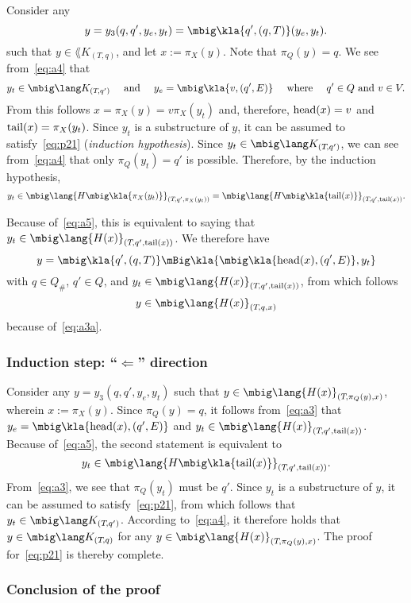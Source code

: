 Consider any
\[
 y = y_3(q,q',y_e,y_t) = \mbig\kla{q',(q,T)}(y_e,y_t).
\]
such that $y\in\lang K_{(T,q)}$, and let $x:=\pi_X(y)$. Note that $\pi_Q(y) =
q$.  We see from~\eqref{eq:a4} that
\[
 y_t \in \mbig\lang K_{(T\!,q')}
 \quad\text{ and }\quad
 y_e = \mbig\kla{v,(q',E)}
 \quad\text{ where }\quad
 q'\in Q \text{ and } v\in V.
\]
From this follows $x = \pi_X(y) = v\pi_X(y_t)$ and, therefore, $\operatorname{head}(x) = v$
and $\operatorname{tail}(x)=\pi_X(y_t)$. Since $y_t$ is a substructure of $y$, it can be
assumed to satisfy~\eqref{eq:p21} (\emph{induction hypothesis}). Since
$y_t\in\mbig\lang K_{(T\!,q')}$, we can see from~\eqref{eq:a4} that only
$\pi_Q(y_t) = q'$ is possible. Therefore, by the induction hypothesis,
\[
 y_t
 \in \mbig\lang{H\mbig\kla{\pi_X(y_t)}}_{(T\!,q',\pi_X(y_t))}
 = \mbig\lang{H\mbig\kla{\cdr(x)}}_{(T\!,q',\cdr(x))}.
\]

Because of~\eqref{eq:a5}, this is equivalent to saying that $y_t \in \mbig\lang{H(x)}_{(T\!,q',\cdr(x))}$. We therefore have
\[
 y = \mbig\kla{q',(q,T)}\mBig\kla{\mbig\kla{\car(x),(q',E)},y_t}
\]
with $q\in Q_\#$, $q'\in Q$, and $y_t \in \mbig\lang{H(x)}_{(T\!,q',\cdr(x))}$,
from which follows
\[
 y \in \mbig\lang{H(x)}_{(T\!,q,x)}
\]
because of~\eqref{eq:a3a}.

\subsubsection*{Induction step: ``$\Leftarrow$'' direction}

Consider any $y = y_3(q,q',y_e,y_t)$ such that
$y\in\mbig\lang{H(x)}_{(T\!,\pi_Q(y),x)}$, wherein $x := \pi_X(y)$. Since
$\pi_Q(y) = q$, it follows from~\eqref{eq:a3} that
$y_e = \mbig\kla{\car(x),(q',E)}$ and
$y_t \in \mbig\lang{H(x)}_{(T\!,q',\cdr(x))}$.
Because of~\eqref{eq:a5}, the second statement is equivalent to
\[
 y_t \in \mbig\lang{H\mbig\kla{\cdr(x)}}_{(T\!,q',\cdr(x))}.
\]
From~\eqref{eq:a3}, we see that $\pi_Q(y_t)$ must be $q'$. Since $y_t$ is a
substructure of $y$, it can be assumed to satisfy~\eqref{eq:p21}, from which
follows that $y_t \in \mbig\lang K_{(T\!,q')}$. According to~\eqref{eq:a4}, it
therefore holds that $y\in\mbig\lang K_{(T\!,q)}$ for any
$y\in\mbig\lang{H(x)}_{(T\!,\pi_Q(y),x)}$. The proof for~\eqref{eq:p21} is
thereby complete.

\subsubsection*{Conclusion of the proof}

